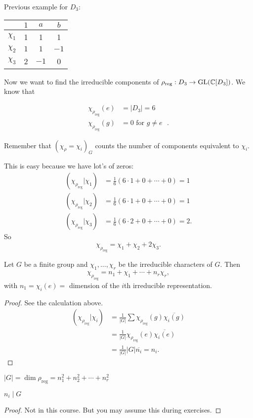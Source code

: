 
Previous example for $ D_3$:
\begin{center}
\begin{tabular}{cccc}
    & $1$ &  $a$ &  $b$ \\ \hline
    $\chi_{1}$ & 1& 1 & 1\\
    $\chi_{2}$ &$1$ & $1$& $-1$\\
    $\chi_{3}$ & 2& $-1$& 0\\
\end{tabular}
\end{center}

Now we want to find the irreducible components of $\rho_\text{reg} : D_3 \to  \operatorname{GL}(\mathbb{C}[D_3])$.
We know that

\begin{align*}
    \chi_{\rho_\text{reg} }(e) &= |D_3|= 6\\
    \chi_{\rho_\text{reg} }(g) &= 0 \text{ for $g \neq e$ }
.\end{align*}

Remember that $(\chi_{\rho} = \chi_{i})_G$ counts the number of components equivalent to $\chi_{i}$.

This is easy because we have lot's of zeros:
\begin{align*}
    (\chi_{\rho_\text{reg}} | \chi_{1}) &= \frac{1}{6} ( 6 \cdot  1 + 0 + \cdots + 0) = 1\\
    (\chi_{\rho_\text{reg}} | \chi_{2}) &= \frac{1}{6} ( 6 \cdot  1 + 0 + \cdots + 0) = 1\\
    (\chi_{\rho_\text{reg}} | \chi_{3}) &= \frac{1}{6} ( 6 \cdot  2 + 0 + \cdots + 0) = 2
.\end{align*} 
So
\[
\chi_{\rho_\text{reg} } = \chi_{1} + \chi_{2} + 2 \chi_{3}
.\] 

\begin{theorem}
    Let $G$ be a finite group and $ \chi_{1}, \ldots, \chi_{r}$ be the irreducible characters of $G.$
    Then 
    \[
    \chi_{\rho_\text{reg} } = n_1 + \chi_{1} + \cdots + n_r \chi_{r}
    ,\] 
    with $n_1 = \chi_{i}(e) = $ dimension of the $i$th irreducible representation.
\end{theorem}
\begin{proof}
    See the calculation above.
    \begin{align*}
        (\chi_{\rho_\text{reg} } | \chi_{i}) &= \frac{1}{|G|} \sum \chi_{\rho_\text{reg} } (g) \overline{\chi_{i} (g)}\\
        &= \frac{1}{|G|} \chi_{\rho_\text{reg} }(e) \overline{\chi_i (e)}\\
        &=\frac{1}{|G|} |G| \overline{n_i} = n_i
    .\end{align*} 
\end{proof}
\begin{corollary}
    $|G| = \dim \rho_\text{reg} =  n_1^2 + n_2^2 + \cdots + n_r^2$
\end{corollary}
\begin{prop}
    $n_i  \mid  G$
\end{prop}
\begin{proof}
    Not in this course. But you may assume this during exercises.
\end{proof}


